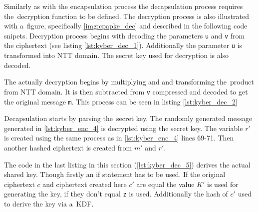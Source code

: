 Similarly as with the encapsulation process the decapsulation process requires the~decryption function to be defined. The decryption process is also illustrated with a~figure, specifically \ref{img:cpapke_dec} and described in the following code snipets. Decryption process begins with decoding the parameters \texttt{u} and \texttt{v} from the ciphertext (see listing \ref{lst:kyber_dec_1}). Additionally the parameter \texttt{u} is transformed into NTT domain. The secret key used for decryption is also decoded.

The actually decryption begins by multiplying  and  and transforming the~product from NTT domain. It is then subtracted from \texttt{v} compressed and decoded to get the original message \texttt{m}. This process can be seen in listing \ref{lst:kyber_dec_2}


Decapsulation starts by parsing the~secret key. The randomly generated message generated in \ref{lst:kyber_enc_4} is decrypted using the secret key. The variable $r'$ is created using the same process as in \ref{lst:kyber_enc_4} lines 69-71. Then another hashed ciphertext is created from $m'$ and $r'$.

The code in the last listing in this section (\ref{lst:kyber_dec_5}) derives the actual shared key. Though firstly an if statement has to be used. If the original ciphertext $c$ and ciphertext created here $c'$ are equal the value $K'$ is used for generating the key, if they don't equal \texttt{z} is used. Additionally the hash of $c'$ used to derive the key via a~KDF.

